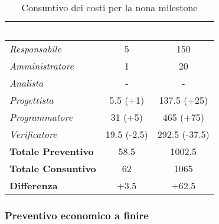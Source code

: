 \begin{table}[H]
    \renewcommand\arraystretch{1.5}
    \centering
    \begin{tabular}{|l|c|c|}
    \hline
    \rowcolor[HTML]{036400}
    \textcolor{white}{\textbf{Ruolo}} & \multicolumn{1}{l|}{\textcolor{white}{\textbf{Ore}}} & \multicolumn{1}{l|}{\textcolor{white}{\textbf{Costo (€)}}} \\ \hline
    \rowcolor[HTML]{EFEFEF}\textit{Responsabile}      & 5           & 150             \\ \hline
    \rowcolor[HTML]{C0C0C0}\textit{Amministratore}    & 1           & 20              \\ \hline
    \rowcolor[HTML]{EFEFEF}\textit{Analista}          & -           & -               \\ \hline
    \rowcolor[HTML]{C0C0C0}\textit{Progettista}       & 5.5 (+1)    & 137.5 (+25)     \\ \hline
    \rowcolor[HTML]{EFEFEF}\textit{Programmatore}     & 31 (+5)     & 465 (+75)       \\ \hline
    \rowcolor[HTML]{C0C0C0}\textit{Verificatore}      & 19.5 (-2.5) & 292.5 (-37.5)   \\ \hline
    \rowcolor[HTML]{EFEFEF}\textbf{Totale Preventivo} & 58.5        & 1002.5          \\ \hline
    \rowcolor[HTML]{C0C0C0}\textbf{Totale Consuntivo} & 62          & 1065            \\ \hline
    \rowcolor[HTML]{EFEFEF}\textbf{Differenza}        & +3.5        & +62.5            \\ \hline
    \end{tabular}
    \caption{Consuntivo dei costi per la nona milestone}
\end{table}

\subsubsection{Preventivo economico a finire}

